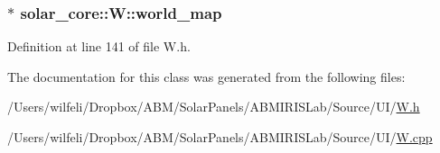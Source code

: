 \subsubsection[{world\+\_\+map}]{$\ast$ solar\+\_\+core\+::\+W\+::world\+\_\+map\hspace{0.3cm}{\ttfamily [protected]}}\label{classsolar__core_1_1_w_a8ed6f1aa7fd4ef2c3488147b38a670b7}


Definition at line 141 of file W.\+h.



The documentation for this class was generated from the following files\+:\begin{DoxyCompactItemize}
\item 
/\+Users/wilfeli/\+Dropbox/\+A\+B\+M/\+Solar\+Panels/\+A\+B\+M\+I\+R\+I\+S\+Lab/\+Source/\+U\+I/\hyperlink{_w_8h}{W.\+h}\item 
/\+Users/wilfeli/\+Dropbox/\+A\+B\+M/\+Solar\+Panels/\+A\+B\+M\+I\+R\+I\+S\+Lab/\+Source/\+U\+I/\hyperlink{_w_8cpp}{W.\+cpp}\end{DoxyCompactItemize}
